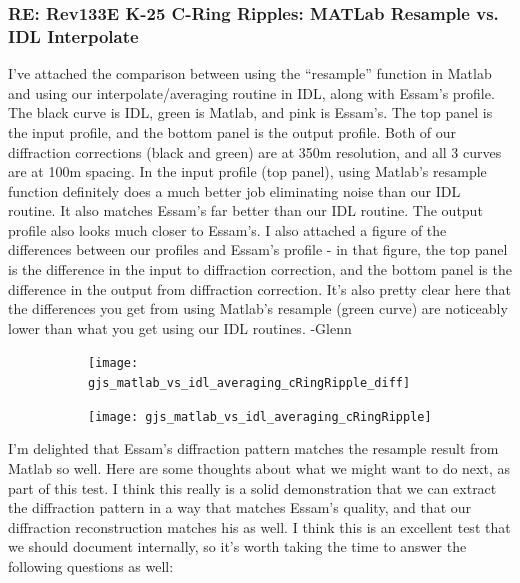 \documentclass[crop=false,class=book]{standalone}
\begin{document}
\subsubsection{\footnotesize RE: Rev133E K-25 C-Ring Ripples: MATLab Resample vs. IDL Interpolate}
I’ve attached the comparison between using the “resample” function in Matlab and using our interpolate/averaging routine in IDL, along with Essam’s profile. The black curve is IDL, green is Matlab, and pink is Essam’s. The top panel is the input profile, and the bottom panel is the output profile. Both of our diffraction corrections (black and green) are at 350m resolution, and all 3 curves are at 100m spacing. In the input profile (top panel), using Matlab’s resample function definitely does a much better job eliminating noise than our IDL routine. It also matches Essam’s far better than our IDL routine. The output profile also looks much closer to Essam’s. I also attached a figure of the differences between our profiles and Essam’s profile - in that figure, the top panel is the difference in the input to diffraction correction, and the bottom panel is the difference in the output from diffraction correction. It’s also pretty clear here that the differences you get from using Matlab’s resample (green curve) are noticeably lower than what you get using our IDL routines. -Glenn
\begin{figure}[H]
    \centering
    \begin{subfigure}[b]{0.49\textwidth}
    \texttt{[image: gjs\_matlab\_vs\_idl\_averaging\_cRingRipple\_diff]}
    \end{subfigure}
    \begin{subfigure}[b]{0.49\textwidth}
    \texttt{[image: gjs\_matlab\_vs\_idl\_averaging\_cRingRipple]}
    \end{subfigure}
\end{figure}
I'm delighted that Essam's diffraction pattern matches the resample result from Matlab so well. Here are some thoughts about what we might want to do next, as part of this test. I think this really is a solid demonstration that we can extract the diffraction pattern in a way that matches Essam's quality, and that our diffraction reconstruction matches his as well. I think this is an excellent test that we should document internally, so it's worth taking the time to answer the following questions as well:
\end{document}
